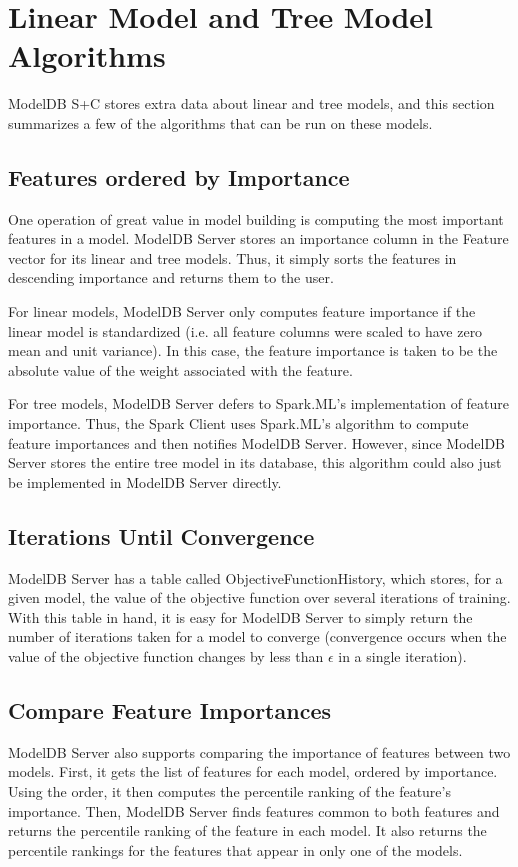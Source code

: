 \section{Linear Model and Tree Model Algorithms}
ModelDB S+C stores extra data about linear and tree models, and this section 
summarizes a few of the algorithms that can be run on these models.

\subsection{Features ordered by Importance}
One operation of great value in model building is computing the most important
features in a model. ModelDB Server stores an importance column in the Feature
vector for its linear and tree models. Thus, it simply sorts the features in
descending importance and returns them to the user.

For linear models, ModelDB Server only computes feature importance if the linear model
is standardized (i.e. all feature columns were scaled to have zero mean and unit variance).
In this case, the feature importance is taken to be the absolute value of the weight 
associated with the feature.

For tree models, ModelDB Server defers to Spark.ML's implementation of feature importance. Thus,
the Spark Client uses Spark.ML's algorithm to compute feature importances and then notifies 
ModelDB Server. However, since ModelDB Server stores the entire tree model in its database, this algorithm
could also just be implemented in ModelDB Server directly.

\subsection{Iterations Until Convergence}
ModelDB Server has a table called ObjectiveFunctionHistory, which stores, for a given model,
the value of the objective function over several iterations of training. With this table in hand,
it is easy for ModelDB Server to simply return the number of iterations taken for a model to converge
(convergence occurs when the value of the objective function changes by less than $\epsilon$ in a single
iteration).

\subsection{Compare Feature Importances}
ModelDB Server also supports comparing the importance of features between two models. First, it gets
the list of features for each model, ordered by importance. Using the order, it then computes the
percentile ranking of the feature's importance. Then, ModelDB Server finds features common to both features
and returns the percentile ranking of the feature in each model. It also returns the percentile rankings for
the features that appear in only one of the models.

